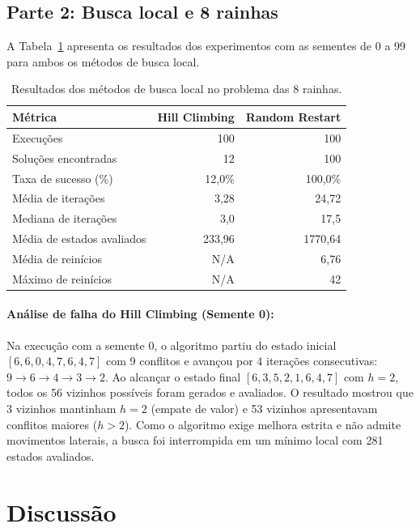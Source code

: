 \documentclass[12pt]{article}
\begin{document}
\subsection{Parte 2: Busca local e 8 rainhas}
A Tabela~\ref{tab:queens} apresenta os resultados dos experimentos com as sementes de 0 a 99 para ambos os métodos de busca local.

\begin{table}[H]
\centering
\vspace{-2mm}
\caption{Resultados dos métodos de busca local no problema das 8 rainhas.}
\label{tab:queens}
\begin{tabularx}{\textwidth}{Xrr}
\toprule
Métrica & Hill Climbing & Random Restart \\
\midrule
Execuções & 100 & 100 \\
Soluções encontradas & 12 & 100 \\
Taxa de sucesso (\%) & 12,0\% & 100,0\% \\
Média de iterações & 3,28 & 24,72 \\
Mediana de iterações & 3,0 & 17,5 \\
Média de estados avaliados & 233,96 & 1770,64 \\
Média de reinícios & N/A & 6,76 \\
Máximo de reinícios & N/A & 42 \\
\bottomrule
\end{tabularx}
\vspace{-2mm}
\end{table}

\paragraph{Análise de falha do Hill Climbing (Semente 0):}
Na execução com a semente 0, o algoritmo partiu do estado inicial $[6, 6, 0, 4, 7, 6, 4, 7]$ com 9 conflitos e avançou por 4 iterações consecutivas: $9 \to 6 \to 4 \to 3 \to 2$. Ao alcançar o estado final $[6, 3, 5, 2, 1, 6, 4, 7]$ com $h=2$, todos os 56 vizinhos possíveis foram gerados e avaliados. O resultado mostrou que 3 vizinhos mantinham $h=2$ (empate de valor) e 53 vizinhos apresentavam conflitos maiores ($h > 2$). Como o algoritmo exige melhora estrita e não admite movimentos laterais, a busca foi interrompida em um mínimo local com 281 estados avaliados.

\section{Discussão}
\end{document}
